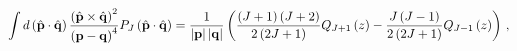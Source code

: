 \begin{equation}
\int d\left( \hat{\mathbf{p}}\cdot \hat{\mathbf{q}}\right) \frac{%
\left( \hat{\mathbf{p}}\times \hat{\mathbf{q}}\right) ^{2}}{\left( 
\mathbf{p}-\mathbf{q}\right) ^{4}}P_{J}\left( \hat{\mathbf{p}}\cdot 
\hat{\mathbf{q}}\right) =\frac{1}{\left| \mathbf{p}\right| \left| 
\mathbf{q}\right| }\left( \frac{\left( J+1\right) \left( J+2\right) }{%
2\left( 2J+1\right) }Q_{J+1}\left( z\right) -\frac{J\left( J-1\right) }{%
2\left( 2J+1\right) }Q_{J-1}\left( z\right) \right) \, ,
\end{equation}

